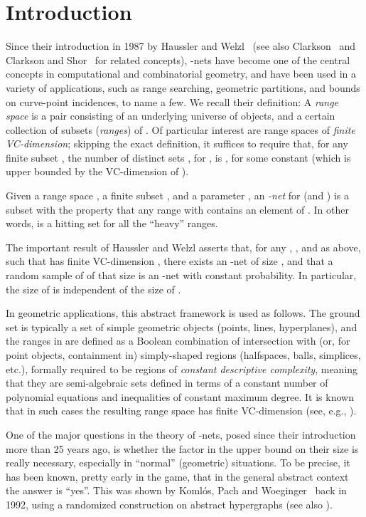 \documentclass[12pt]{article}
\providecommand{\Komlos}{Koml\'os\xspace}
\begin{document}
\section{Introduction}

Since their introduction in 1987 by Haussler and
Welzl~\cite{hw-ensrq-87} (see also Clarkson~\cite{c-narsc-87} and
Clarkson and Shor~\cite{cs-arscg-89} for related concepts),
-nets have become one of the central concepts in computational
and combinatorial geometry, and have been used in a variety of
applications, such as range searching, geometric partitions, and
bounds on curve-point incidences, to name a few. We recall their
definition: A {\em range space}  is a pair consisting of an
underlying universe  of objects, and a certain collection  of
subsets ({\em ranges}) of . Of particular interest are range spaces
of {\em finite VC-dimension}; skipping the exact definition, it
suffices to require that, for any finite subset , the
number of distinct sets , for , is , for
some constant  (which is upper bounded by the VC-dimension of
).

Given a range space , a finite subset , and a
parameter , an {\em -net} for  (and ) is a
subset  with the property that any range  with
 contains an element of . In other words, 
is a hitting set for all the ``heavy'' ranges.

The important result of Haussler and Welzl asserts that, for any
, , and  as above, such that  has finite
VC-dimension , there exists an -net  of size
, and that a random
sample of  of that size is an -net with constant
probability. In particular, the size of  is independent of the size
of .

In geometric applications, this abstract framework is used as
follows. The ground set  is typically a set of simple geometric
objects (points, lines, hyperplanes), and the ranges in  are
defined as a Boolean combination of intersection with (or, for point
objects, containment in) simply-shaped regions (halfspaces, balls,
simplices, etc.), formally required to be regions of {\em constant
   descriptive complexity}, meaning that they are semi-algebraic sets
defined in terms of a constant number of polynomial equations and
inequalities of constant maximum degree.  It is known that in such
cases the resulting range space  has finite VC-dimension (see,
e.g., \cite{m-ldg-02}).

One of the major questions in the theory of -nets, posed since
their introduction more than 25 years ago, is whether the factor
 in the upper bound on their size is really
necessary, especially in ``normal'' (geometric) situations. To be
precise, it has been known, pretty early in the game, that in the
general abstract context the answer is ``yes''. This was shown by
\Komlos, Pach and Woeginger~\cite{kpw-atben-92} back in 1992, using a
randomized construction on abstract hypergraphs (see also
\cite{pa-cg-95}).
\end{document}
